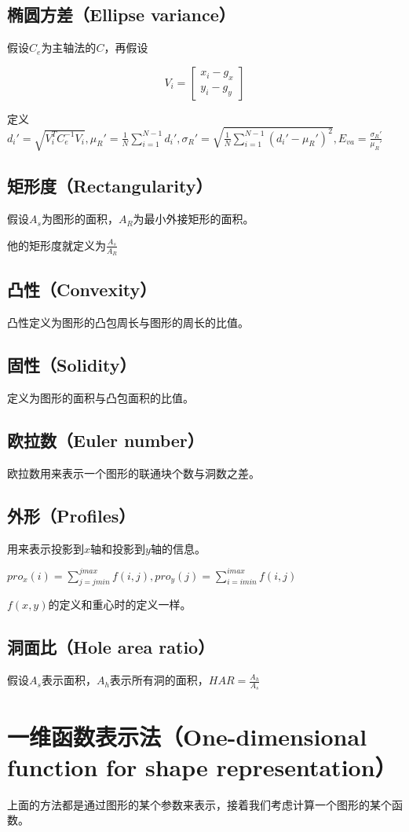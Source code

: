 \documentclass{ctexart}
\begin{document}
\subsection{椭圆方差（Ellipse variance）}
假设$C_e$为主轴法的$C$，再假设

\[V_i=\begin{bmatrix}x_i-g_x \\ y_i-g_y\end{bmatrix}\]

定义$d_i'=\sqrt{V_i^TC_e^{-1}V_i},\mu_R'=\frac{1}{N}\sum\limits_{i=1}^{N-1}d_i',\sigma_R'=\sqrt{\frac{1}{N}\sum\limits_{i=1}^{N-1}(d_i'-\mu_R')^2},E_{va}=\frac{\sigma_R'}{\mu_R'}$
\subsection{矩形度（Rectangularity）}
假设$A_s$为图形的面积，$A_R$为最小外接矩形的面积。

他的矩形度就定义为$\frac{A_s}{A_R}$
\subsection{凸性（Convexity）}
凸性定义为图形的凸包周长与图形的周长的比值。
\subsection{固性（Solidity）}
定义为图形的面积与凸包面积的比值。
\subsection{欧拉数（Euler number）}
欧拉数用来表示一个图形的联通块个数与洞数之差。
\subsection{外形（Profiles）}
用来表示投影到$x$轴和投影到$y$轴的信息。

$pro_x(i)=\sum\limits_{j=jmin}^{jmax}f(i,j),pro_y(j)=\sum\limits_{i=imin}^{imax}f(i,j)$

$f(x,y)$的定义和重心时的定义一样。

\subsection{洞面比（Hole area ratio）}

假设$A_s$表示面积，$A_h$表示所有洞的面积，$HAR=\frac{A_h}{A_s}$
\section{一维函数表示法（One-dimensional function for shape representation）}
上面的方法都是通过图形的某个参数来表示，接着我们考虑计算一个图形的某个函数。
\end{document}
